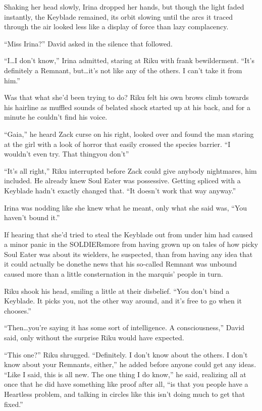 Shaking her head slowly, Irina dropped her hands, but though the light faded instantly, the Keyblade remained, its orbit slowing until the arcs it traced through the air looked less like a display of force than lazy complacency.

``Miss Irina?'' David asked in the silence that followed.

``I\ldots I don't know,'' Irina admitted, staring at Riku with frank bewilderment. ``It's definitely a Remnant, but\ldots it's not like any of the others. I can't take it from him.''

Was that what she'd been trying to do? Riku felt his own brows climb towards his hairline as muffled sounds of belated shock started up at his back, and for a minute he couldn't find his voice.

``Gaia,'' he heard Zack curse on his right, looked over and found the man staring at the girl with a look of horror that easily crossed the species barrier. ``I wouldn't even try. That thing\textemdash you don't\textemdash ''

``It's all right,'' Riku interrupted before Zack could give anybody nightmares, him included. He already knew Soul Eater was possessive. Getting spliced with a Keyblade hadn't exactly changed that. ``It doesn't work that way anyway.''

Irina was nodding like she knew what he meant, only what she said was, ``You haven't bound it.''

If hearing that she'd tried to steal the Keyblade out from under him had caused a minor panic in the SOLDIERs\textemdash more from having grown up on tales of how picky Soul Eater was about its wielders, he suspected, than from having any idea that it could actually be done\textemdash the news that his so-called Remnant was unbound caused more than a little consternation in the marquis' people in turn.

Riku shook his head, smiling a little at their disbelief. ``You don't bind a Keyblade. It picks you, not the other way around, and it's free to go when it chooses.''

``Then\ldots you're saying it has some sort of intelligence. A consciousness,'' David said, only without the surprise Riku would have expected.

``This one?'' Riku shrugged. ``Definitely. I don't know about the others. I don't know about your Remnants, either,'' he added before anyone could get any ideas. ``Like I said, this is all new. The one thing I do know,'' he said, realizing all at once that he did have something like proof after all, ``is that you people have a Heartless problem, and talking in circles like this isn't doing much to get that fixed.''

